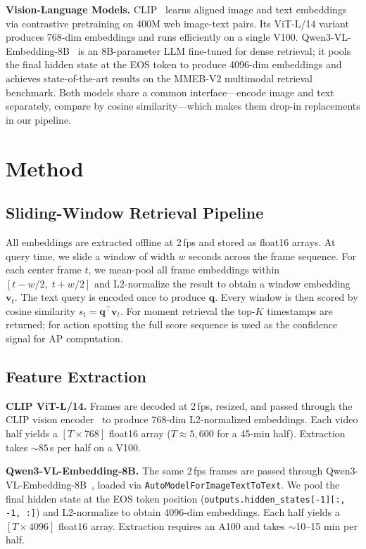 \documentclass[10pt,twocolumn]{article}
\begin{document}
\noindent\textbf{Vision-Language Models.}
CLIP~\cite{radford2021clip} learns aligned image and text embeddings via contrastive pretraining on 400M web image-text pairs. Its ViT-L/14 variant produces 768-dim embeddings and runs efficiently on a single V100. Qwen3-VL-Embedding-8B~\cite{qwen3vl} is an 8B-parameter LLM fine-tuned for dense retrieval; it pools the final hidden state at the EOS token to produce 4096-dim embeddings and achieves state-of-the-art results on the MMEB-V2 multimodal retrieval benchmark. Both models share a common interface---encode image and text separately, compare by cosine similarity---which makes them drop-in replacements in our pipeline.

\section{Method}

\subsection{Sliding-Window Retrieval Pipeline}

All embeddings are extracted offline at 2\,fps and stored as float16 arrays. At query time, we slide a window of width $w$ seconds across the frame sequence. For each center frame $t$, we mean-pool all frame embeddings within $[t - w/2,\; t + w/2]$ and L2-normalize the result to obtain a window embedding $\mathbf{v}_t$. The text query is encoded once to produce $\mathbf{q}$. Every window is then scored by cosine similarity $s_t = \mathbf{q}^\top \mathbf{v}_t$. For moment retrieval the top-$K$ timestamps are returned; for action spotting the full score sequence is used as the confidence signal for AP computation.

\subsection{Feature Extraction}

\noindent\textbf{CLIP ViT-L/14.}
Frames are decoded at 2\,fps, resized, and passed through the CLIP vision encoder~\cite{radford2021clip} to produce 768-dim L2-normalized embeddings. Each video half yields a $[T \times 768]$ float16 array ($T \approx 5{,}600$ for a 45-min half). Extraction takes ${\sim}85$\,s per half on a V100.

\noindent\textbf{Qwen3-VL-Embedding-8B.}
The same 2\,fps frames are passed through Qwen3-VL-Embedding-8B~\cite{qwen3vl}, loaded via \texttt{AutoModelForImageTextToText}. We pool the final hidden state at the EOS token position (\texttt{outputs.hidden\_states[-1][:, -1, :]}) and L2-normalize to obtain 4096-dim embeddings. Each half yields a $[T \times 4096]$ float16 array. Extraction requires an A100 and takes ${\sim}$10--15 min per half.
\end{document}
